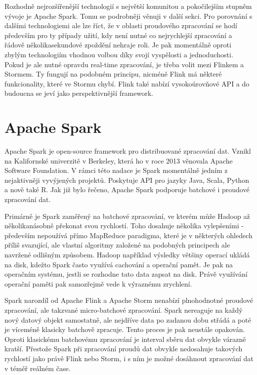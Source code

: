 \documentclass[thesis=B,czech]{FITthesis}[2012/06/26]
\begin{document}
	Rozhodně nejrozšířenější technologií s největší komunitou a pokočilejším stupněm vývoje je Apache Spark. Tomu se podrobněji věnuji v další sekci. Pro porovnání s dalšími technologiemi ale lze říct, že v oblasti proudového zpracování se hodí především pro ty případy užití, kdy není nutné co nejrychlejší zpracování a řádově několikasekundové zpoždění nehraje roli. Je pak momentálně oproti zbylým technologiím vhodnou volbou díky svojí vyspělosti a jednoduchosti. Pokud je ale nutné opravdu real-time zpracování, je třeba volit mezi Flinkem a Stormem. Ty fungují na podobném principu, nicméně Flink má některé funkcionality, které ve Stormu chybí\cite{so-flink-storm}. Flink také nabízí vysokoúrovňové API a do budoucna se jeví jako perspektivnější framework. 
	
	
	
\section{Apache Spark}
	Apache Spark je open-source framework pro distribuované zpracování dat. Vznikl na Kalifornské univerzitě v Berkeley, která ho v roce 2013 věnovala Apache Software Foundation. V rámci této nadace je Spark momentálně jedním z nejaktivněji vyvýjených projektů\cite{spark-toplevel}. Poskytuje API pro jazyky Java, Scala, Python a nově také R. Jak již bylo řečeno, Apache Spark podporuje batchové i proudové zpracování dat. 
	
	Primárně je Spark zaměřený na batchové zpracování, ve kterém může Hadoop až několikanásobně překonat svou rychlostí. Toho dosahuje několika vylepšeními - především nepoužívá přímo MapReduce paradigma, které je v některých ohledech příliš svazující, ale vlastní algoritmy založené na podobných principech ale navržené odlišným způsobem. Hadoop například výsledky většiny operací ukládá na disk, kdežto Spark často využívá cachování a operační pamět. Je pak na operačním systému, jestli se rozhodne tato data zapsat na disk\cite{spark-mapreduce-difference}. Právě využívání operační paměti pak samozřejmě vede k výraznému zrychlení. 
		
	Spark narozdíl od Apache Flink a Apache Storm nenabízí plnohodnotné proudové zpracování, ale takzvané micro-batchové zpracování. Spark nereaguje na každý nový datový objekt samostatně, ale nejdříve data po zadanou dobu střádá a poté je víceméně klasicky batchově zpracuje. Tento proces je pak neustále opakován. Oproti klasickému batchovému zpracování je interval sběru dat obvykle várazně kratší.  Přestože Spark při zpracování proudů dat obvykle nedosahuje takových rychlostí jako právě Flink nebo Storm, i s ním je možné dosáhnout zpracování dat v téměř reálném čase\cite{streaming-benchmark}. 
\end{document}

